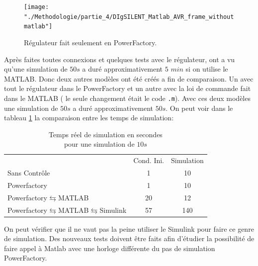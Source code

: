 
\begin{figure}[H]
	\begin{center}	
		\texttt{[image: "./Methodologie/partie\_4/DIgSILENT\_Matlab\_AVR\_frame\_withoutmatlab"]}
		\caption{Régulateur fait seulement en PowerFactory.}
		\label{fig:DIgSILENT_Matlab_AVR_frame_withoutmatlab}
	\end{center}
\end{figure}

Après faites toutes connexions et quelques tests avec le régulateur, ont a vu qu'une simulation de $ 50s $ a duré approximativement $ 5$ $min $ si on utilise le MATLAB. Donc deux autres modèles ont été créés a fin de comparaison. Un avec tout le régulateur dans le PowerFactory et un autre avec la loi de commande fait dans le MATLAB ( le seule changement était le code \verb|.m|). Avec ces deux modèles une simulation de $50s$ a duré approximativement $ 50s $.
On peut voir dans le tableau \ref{tab:comparaisontempssimul} la comparaison entre les temps de simulation:

\begin{table}[H]
	\centering
	\captionsetup{justification=centering,margin=2cm}
	\caption{Temps réel de simulation en secondes\\ pour une simulation de $ 10s $}
	\label{tab:comparaisontempssimul}
	\begin{tabular}{lcc}
		&Cond. Ini.&Simulation\\
		Sans Contrôle&1&10\\
		Powerfactory&1&10\\
		Powerfactory$ \leftrightarrows $MATLAB&20&12\\
		Powerfactory$ \leftrightarrows $MATLAB$ \leftrightarrows $Simulink&57&140\\
	\end{tabular}
\end{table}
On peut vérifier que il ne vaut pas la peine utiliser le Simulink pour faire ce genre de simulation. Des nouveaux tests doivent être faits afin d'étudier la possibilité de faire appel à Matlab avec une horloge différente du pas de simulation PowerFactory.



